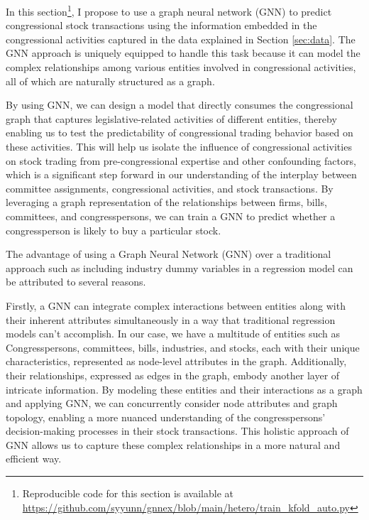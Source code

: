 \documentclass[15pt,letterpaper]{article}
\begin{document}
In this section\footnote{Reproducible code for this section is available at \url{https://github.com/syyunn/gnnex/blob/main/hetero/train_kfold_auto.py}}, I propose to use a graph neural network (GNN) \citep{gnn1, gnn2, gnn3, gnn4} to predict congressional stock transactions using the information embedded in the congressional activities captured in the data explained in Section \ref{sec:data}. The GNN approach is uniquely equipped to handle this task because it can model the complex relationships among various entities involved in congressional activities, all of which are naturally structured as a graph.

By using GNN, we can design a model that directly consumes the congressional graph that captures legislative-related activities of different entities, thereby enabling us to test the predictability of congressional trading behavior based on these activities. This will help us isolate the influence of congressional activities on stock trading from pre-congressional expertise and other confounding factors, which is a significant step forward in our understanding of the interplay between committee assignments, congressional activities, and stock transactions.
By leveraging a graph representation of the relationships between firms, bills, committees, and congresspersons, we can train a GNN to predict whether a congressperson is likely to buy a particular stock. 



The advantage of using a Graph Neural Network (GNN) over a traditional approach such as including industry dummy variables in a regression model can be attributed to several reasons.


Firstly, a GNN can integrate complex interactions between entities along with their inherent attributes simultaneously in a way that traditional regression models can't accomplish. In our case, we have a multitude of entities such as Congresspersons, committees, bills, industries, and stocks, each with their unique characteristics, represented as node-level attributes in the graph. Additionally, their relationships, expressed as edges in the graph, embody another layer of intricate information. By modeling these entities and their interactions as a graph and applying GNN, we can concurrently consider node attributes and graph topology, enabling a more nuanced understanding of the congresspersons' decision-making processes in their stock transactions. This holistic approach of GNN allows us to capture these complex relationships in a more natural and efficient way.
\end{document}
